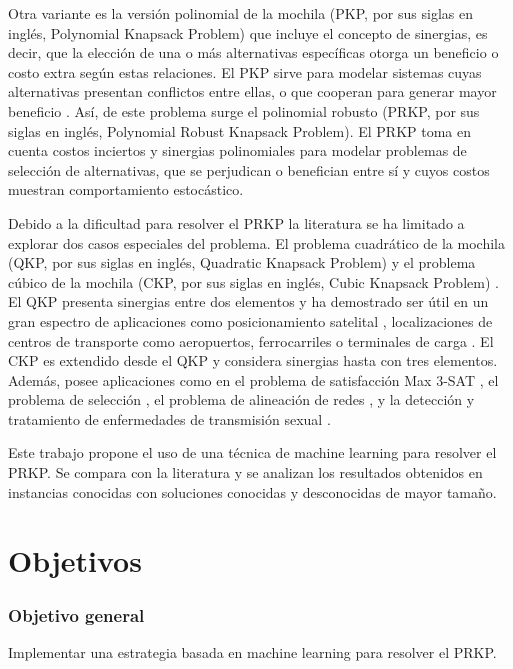 \documentclass[spanish, a4paper, 12pt, openany,final]{book}
\begin{document}
Otra variante es la versión polinomial de la mochila (PKP, por sus siglas en inglés, Polynomial Knapsack Problem) que incluye el concepto de sinergias, es decir, que la elección de una o más alternativas específicas otorga un beneficio o costo extra según estas relaciones. El PKP sirve para modelar sistemas cuyas alternativas presentan conflictos entre ellas, o que cooperan para generar mayor beneficio \citep{baldo_polynomial_2023}. Así, de este problema surge el polinomial robusto (PRKP, por sus siglas en inglés, Polynomial Robust Knapsack Problem). El PRKP toma en cuenta costos inciertos y sinergias polinomiales para modelar problemas de selección de alternativas, que se perjudican o benefician entre sí y cuyos costos muestran comportamiento estocástico.

Debido a la dificultad para resolver el PRKP la literatura se ha limitado a explorar dos casos especiales del problema. El problema cuadrático de la mochila (QKP, por sus siglas en inglés, Quadratic Knapsack Problem) \citep{gallo_quadratic_1980} y el problema cúbico de la mochila (CKP, por sus siglas en inglés, Cubic Knapsack Problem) \citep{forrester_strengthening_2022}. El QKP presenta sinergias entre dos elementos y ha demostrado ser útil en un gran espectro de aplicaciones como posicionamiento satelital \citep{witzgall_mathematical_1975}, localizaciones de centros de transporte como aeropuertos, ferrocarriles o terminales de carga \citep{rhys_selection_1970}. El CKP es extendido desde el QKP y considera sinergias hasta con tres elementos. Además, posee aplicaciones como en el problema de satisfacción Max 3-SAT \citep{kofler_penalty_2014}, el problema de selección \citep{gallo_fast_1989}, el problema de alineación de redes \citep{mohammadi_triangular_2017}, y la detección y tratamiento de enfermedades de transmisión sexual \citep{zhao_treatments_2008}.

Este trabajo propone el uso de una técnica de machine learning para resolver el PRKP. Se compara con la literatura y se analizan los resultados obtenidos en instancias conocidas con soluciones conocidas y desconocidas de mayor tamaño.

\section{Objetivos}
\subsubsection*{Objetivo general}
Implementar una estrategia basada en machine learning para resolver el PRKP.
\end{document}
